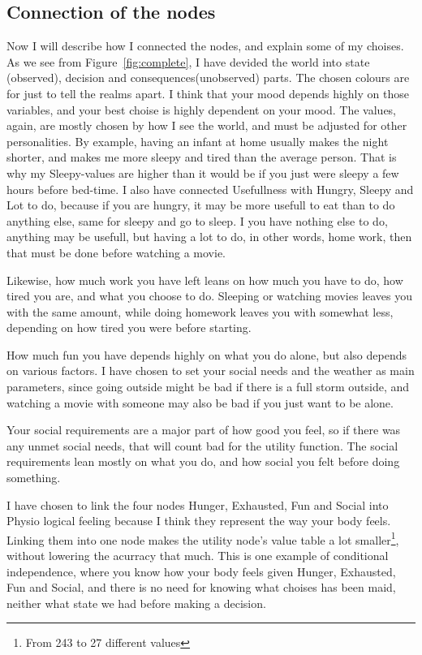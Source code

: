 \subsection{Connection of the nodes}
Now I will describe how I connected the nodes, and explain some of my choises.
As we see from Figure~\ref{fig:complete}, I have devided the world into state
(observed), decision and consequences(unobserved) parts. The chosen colours are
for just to tell the realms apart. I think that your mood depends highly on
those variables, and your best choise is highly dependent on your mood. The
values, again, are mostly chosen by how I see the world, and must be adjusted
for other personalities. By example, having an infant at home usually makes the
night shorter, and makes me more sleepy and tired than the average person. That
is why my Sleepy-values are higher than it would be if you just were sleepy a
few hours before bed-time. I also have connected Usefullness with Hungry, Sleepy
and Lot to do, because if you are hungry, it may be more usefull to eat than to
do anything else, same for sleepy and go to sleep. I you have nothing else to
do, anything may be usefull, but having a lot to do, in other words, home work,
then that must be done before watching a movie.

Likewise, how much work you have left leans on how much you have to do, how
tired you are, and what you choose to do. Sleeping or watching movies leaves you
with the same amount, while doing homework leaves you with somewhat less,
depending on how tired you were before starting.

How much fun you have depends highly on what you do alone, but also depends on
various factors. I have chosen to set your social needs and the weather as main
parameters, since going outside might be bad if there is a full storm outside,
and watching a movie with someone may also be bad if you just want to be alone.

Your social requirements are a major part of how good you feel, so if there was
any unmet social needs, that will count bad for the utility function. The social
requirements lean mostly on what you do, and how social you felt before doing
something.

I have chosen to link the four nodes Hunger, Exhausted, Fun and Social into
Physio logical feeling because I think they represent the way your body feels.
Linking them into one node makes the utility node's value table a lot
smaller\footnote{From 243 to 27 different values}, without lowering the acurracy
that much. This is one example of conditional
independence, where you know how your body feels given Hunger, Exhausted, Fun
and Social, and there is no need for knowing what choises has been maid,
neither what state we had before making a decision.

